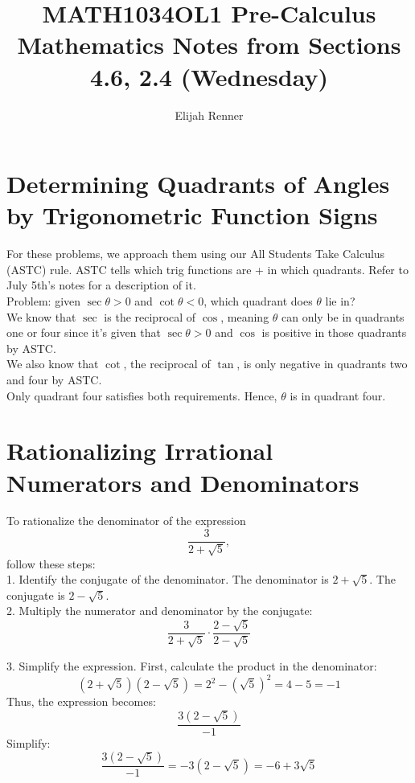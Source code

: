 \documentclass[12pt]{article}
\title{MATH1034OL1 Pre-Calculus Mathematics Notes from Sections 4.6, 2.4 (Wednesday)}
\author{Elijah Renner}
\begin{document}
\maketitle

\vspace{0.5in}

\tableofcontents

\section{Determining Quadrants of Angles by Trigonometric Function Signs}

For these problems, we approach them using our All Students Take Calculus (ASTC) rule. ASTC tells which trig functions are + in which quadrants. Refer to July 5th's notes for a description of it.\\

Problem: given \(\sec\theta>0\) and \(\cot\theta<0\), which quadrant does \(\theta\) lie in?\\

We know that \(\sec\) is the reciprocal of \(\cos\), meaning \(\theta\) can only be in quadrants one or four since it's given that  \(\sec\theta>0\) and \(\cos\) is positive in those quadrants by ASTC.\\

We also know that \(\cot\), the reciprocal of \(\tan\), is only negative in quadrants two and four by ASTC.\\

Only quadrant four satisfies both requirements. Hence, \(\theta\) is in quadrant four.\\

\section{Rationalizing Irrational Numerators and Denominators}

To rationalize the denominator of the expression
\[
\frac{3}{2 + \sqrt{5}},
\]
follow these steps:\\

1. Identify the conjugate of the denominator. The denominator is \(2 + \sqrt{5}\). The conjugate is \(2 - \sqrt{5}\).\\

2. Multiply the numerator and denominator by the conjugate:
\[
\frac{3}{2 + \sqrt{5}} \cdot \frac{2 - \sqrt{5}}{2 - \sqrt{5}}
\]

3. Simplify the expression. First, calculate the product in the denominator:
\[
(2 + \sqrt{5})(2 - \sqrt{5}) = 2^2 - (\sqrt{5})^2 = 4 - 5 = -1
\]
Thus, the expression becomes:
\[
\frac{3(2 - \sqrt{5})}{-1}
\]
Simplify:
\[
\frac{3(2 - \sqrt{5})}{-1} = -3(2 - \sqrt{5}) = -6 + 3\sqrt{5}
\]
\end{document}
